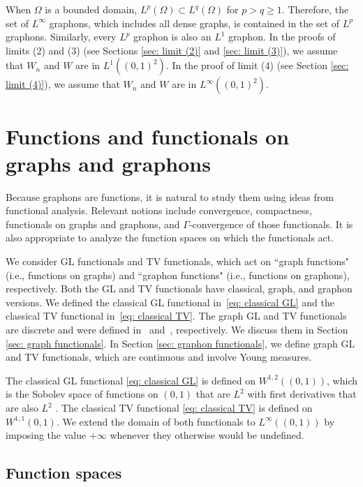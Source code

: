 \documentclass[11pt]{amsart}
\numberwithin{equation}{section}
\begin{document}
{When $\Omega$ is a bounded domain, $L^p(\Omega) \subset L^q(\Omega)$ for $p > q \geq 1$. Therefore, the set of $L^\infty$ graphons, which includes all dense graphs, is contained in the set of $L^p$ graphons. Similarly, every $L^p$ graphon is also an $L^1$ graphon. In the proofs of limits (2) and (3) (see Sections \ref{sec: limit (2)} and \ref{sec: limit (3)}), we {assume that}
$W_n$ and $W$ are in {$L^1((0,1)^2)$.} 
In the proof of limit (4) (see Section \ref{sec: limit (4)}{)}, we assume that $W_n$ and $W$ are in $L^\infty((0,1)^2)$.



\section{Functions and functionals on graphs and graphons}\label{sec: notation}

Because graphons are functions, it is natural to study them using ideas from functional analysis. Relevant notions include convergence, compactness, functionals on graphs and graphons, and $\Gamma$-convergence of those functionals. It is also appropriate to analyze the function spaces on which the functionals act.

We consider GL functionals and TV functionals, which act on ``graph functions" (i.e., functions on graphs) and ``graphon functions" (i.e., functions on graphons), respectively. Both the GL and TV functionals have classical, graph, and graphon versions. We defined the classical GL functional in~\eqref{eq: classical GL} and the classical TV functional in~\eqref{eq: classical TV}. The graph GL and TV {functionals} are discrete and were defined {in~\cite{bertozzi2012diffuse} and~\cite{szlam2010total}, respectively.} We discuss them in {Section \ref{sec: graph functionals}.}
In Section \ref{sec: graphon functionals}, we define graph GL and TV functionals, which are continuous and involve Young measures.

The classical GL {functional \eqref{eq: classical GL}} is defined {on} $W^{1,2}((0,1))$, which is the Sobolev space of functions on $(0,1)$ that are $L^2$ with first derivatives that are also $L^2$ \cite[Chapter 5]{evans2022partial}. 
The classical {TV functional \eqref{eq: classical TV}} is defined on $W^{1,1}(0,1)$. We extend the domain of both functionals to $L^\infty((0,1))$ by imposing the value $+\infty$ whenever they otherwise would be undefined.


\subsection{Function spaces}\label{four-one}

}
\end{document}
